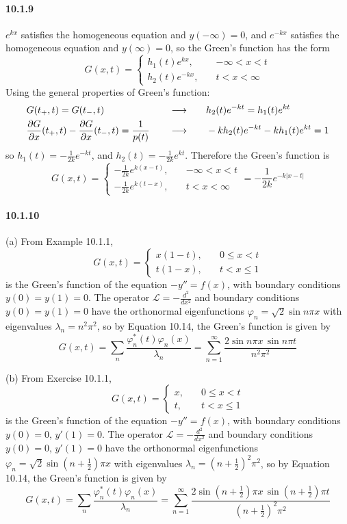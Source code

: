 \documentclass[a4paper]{article}
\begin{document}
\paragraph{10.1.9}
$e^{kx}$ satisfies the homogeneous equation and $y(-\infty)=0$, and $e^{-kx}$ satisfies the homogeneous equation and $y(\infty)=0$, so the Green's function has the form
\[
G(x,t)=
\begin{cases}
h_1(t)e^{kx} ,\quad & -\infty<x<t\\
h_2(t)e^{-kx} ,\quad & t<x<\infty
\end{cases}
\]
Using the general properties of Green's function:
\begin{alignat*}{3}
    & G(t_+,t)=G(t_-,t)\quad && \longrightarrow\quad && h_2(t)e^{-kt}=h_1(t)e^{kt} \\
    & \frac{\partial G}{\partial x}(t_+,t)-\frac{\partial G}{\partial x}(t_-,t)=\frac{1}{p(t)}\quad && \longrightarrow\quad && -kh_2(t)e^{-kt}-kh_1(t)e^{kt}=1
\end{alignat*}
so $h_1(t)=-\frac{1}{2k}e^{-kt}$, and $h_2(t)=-\frac{1}{2k}e^{kt}$. Therefore the Green's function is
\[
G(x,t)=
\begin{cases}
-\frac{1}{2k}e^{k(x-t)} ,\quad & -\infty<x<t\\[5pt]
-\frac{1}{2k}e^{k(t-x)} ,\quad & t<x<\infty
\end{cases}
=-\frac{1}{2k}e^{-k|x-t|}
\]

\paragraph{10.1.10}
(a) From Example 10.1.1,
\[
G(x,t)=
\begin{cases}
x(1-t),\quad & 0\leq x<t\\
t(1-x),\quad & t<x\leq1
\end{cases}
\]
is the Green's function of the equation $-y''=f(x)$, with boundary conditions $y(0)=y(1)=0$. The operator $\mathcal{L}=-\frac{d^2}{dx^2}$ and boundary conditions $y(0)=y(1)=0$ have the orthonormal eigenfunctions $\varphi_n=\sqrt{2}\sin n\pi x$ with eigenvalues $\lambda_n=n^2\pi^2$, so by Equation 10.14, the Green's function is given by
\[
G(x,t)=\sum_n\frac{\varphi_n^*(t)\varphi_n(x)}{\lambda_n}=\sum_{n=1}^\infty\frac{2\sin n\pi x\,\sin n\pi t}{n^2\pi^2}
\]

(b) From Exercise 10.1.1, 
\[
G(x,t)=
\begin{cases}
x,\quad & 0\leq x<t\\
t,\quad & t<x\leq1
\end{cases}
\]
is the Green's function of the equation $-y''=f(x)$, with boundary conditions $y(0)=0,\,y'(1)=0$. The operator $\mathcal{L}=-\frac{d^2}{dx^2}$ and boundary conditions $y(0)=0,\,y'(1)=0$ have the orthonormal eigenfunctions $\varphi_n=\sqrt{2}\sin(n+\frac{1}{2})\pi x$ with eigenvalues $\lambda_n=(n+\frac{1}{2})^2\pi^2$, so by Equation 10.14, the Green's function is given by
\[
G(x,t)=\sum_n\frac{\varphi_n^*(t)\varphi_n(x)}{\lambda_n}=\sum_{n=1}^\infty\frac{2\sin(n+\frac{1}{2})\pi x\,\sin (n+\frac{1}{2})\pi t}{(n+\frac{1}{2})^2\pi^2}
\] 
\end{document}
